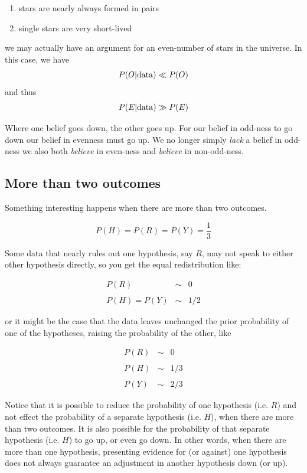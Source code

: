 \begin{enumerate}
\def\labelenumi{\arabic{enumi}.}
\itemsep1pt\parskip0pt
\item
  stars are nearly always formed in pairs
\item
  single stars are very short-lived
\end{enumerate}

we may actually have an argument for an even-number of stars in the
universe. In this case, we have \[
P(O|{\rm data}) \ll P(O)
\] and thus \[
P(E|{\rm data}) \gg P(E)
\]

Where one belief goes down, the other goes up. For our belief in
odd-ness to go down our belief in evenness must go up. We no longer
simply \emph{lack} a belief in odd-ness we also both \emph{believe} in
even-ness and \emph{believe} in non-odd-ness.

\subsection{More than two outcomes}\label{more-than-two-outcomes}

Something interesting happens when there are more than two outcomes.

\[
P(H)=P(R)=P(Y)=\frac{1}{3}
\]

Some data that nearly rules out one hypothesis, say \(R\), may not speak
to either other hypothesis directly, so you get the equal redistribution
like:

\begin{eqnarray}
\nonumber P(R)&\sim& 0 \\\\ 
\nonumber P(H)=P(Y)&\sim& 1/2 
\end{eqnarray}

or it might be the case that the data leaves unchanged the prior
probability of one of the hypotheses, raising the probability of the
other, like

\begin{eqnarray}
\nonumber P(R)&\sim& 0 \\\\ 
\nonumber P(H)&\sim& 1/3 \\\\
\nonumber P(Y)&\sim& 2/3 
\end{eqnarray}

Notice that it is possible to reduce the probability of one hypothesis
(i.e. \(R\)) and not effect the probability of a separate hypothesis
(i.e. \(H\)), when there are more than two outcomes. It is also possible
for the probability of that separate hypothesis (i.e. \(H\)) to go up,
or even go down. In other words, when there are more than one
hypothesis, presenting evidence for (or against) one hypothesis does not
always guarantee an adjustment in another hypothesis down (or up).





